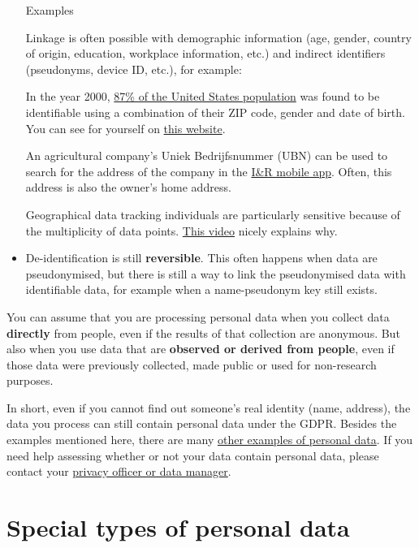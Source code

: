 \documentclass[
]{book}
\begin{document}
\begin{itemize}
  Examples

  Linkage is often possible with demographic information (age,
  gender, country of origin, education, workplace information, etc.) and
  indirect identifiers (pseudonyms, device ID, etc.), for example:

  In the year 2000,
  \href{https://dataprivacylab.org/projects/identifiability/paper1.pdf}{87\% of the United States population}
  was found to be identifiable using a combination of their ZIP code, gender
  and date of birth. You can see for yourself on
  \href{https://cpg.doc.ic.ac.uk/individual-risk/}{this website}.

  An agricultural company's Uniek Bedrijfsnummer (UBN) can be used to
  search for the address of the company in the
  \href{https://www.rvo.nl/onderwerpen/identificatie-en-registratie-dieren/app-ir-dieren}{I\&R mobile app}.
  Often, this address is also the owner's home address.

  Geographical data tracking individuals are particularly sensitive
  because of the multiplicity of data points.
  \href{https://www.youtube.com/watch?v=Pivd71NYKDA}{This video}
  nicely explains why.
\item
  De-identification is still \textbf{reversible}. This often happens when data are
  pseudonymised, but there is still a way to link the pseudonymised data with
  identifiable data, for example when a name-pseudonym key still exists.
\end{itemize}

You can assume that you are processing personal data when you collect data
\textbf{directly} from people, even if the results of that collection are anonymous. But
also when you use data that are \textbf{observed or derived from people}, even if those
data were previously collected, made public or used for non-research purposes.

In short, even if you cannot find out someone's real identity (name, address),
the data you process can still contain personal data under the GDPR. Besides
the examples mentioned here, there are many
\href{https://intranet.uu.nl/system/files/documenten/categories-of-personal-information-en.pdf}{other examples of personal data}.
If you need help assessing whether or not your data contain personal data,
please contact your \protect\hyperlink{support}{privacy officer or data manager}.

\hypertarget{special-types-personal-data}{%
\section{Special types of personal data}\label{special-types-personal-data}}
\end{document}
